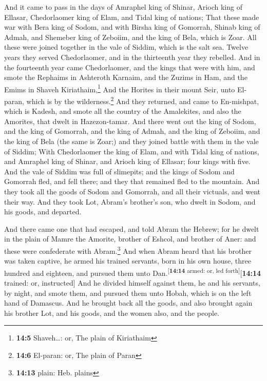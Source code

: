  And it came to pass in the days of Amraphel king of
Shinar, Arioch king of Ellasar, Chedorlaomer king of Elam, and Tidal
king of nations;  That these made war with Bera king of
Sodom, and with Birsha king of Gomorrah, Shinab king of Admah, and
Shemeber king of Zeboiim, and the king of Bela, which is Zoar.
 All these were joined together in the vale of Siddim,
which is the salt sea.  Twelve years they served
Chedorlaomer, and in the thirteenth year they rebelled. 
And in the fourteenth year came Chedorlaomer, and the kings that were
with him, and smote the Rephaims in Ashteroth Karnaim, and the Zuzims in
Ham, and the Emims in Shaveh Kiriathaim,\footnote{\textbf{14:5}
  Shaveh\ldots: or, The plain of Kiriathaim}  And the
Horites in their mount Seir, unto El-paran, which is by the
wilderness.\footnote{\textbf{14:6} El-paran: or, The plain of Paran}
 And they returned, and came to En-mishpat, which is
Kadesh, and smote all the country of the Amalekites, and also the
Amorites, that dwelt in Hazezon-tamar.  And there went out
the king of Sodom, and the king of Gomorrah, and the king of Admah, and
the king of Zeboiim, and the king of Bela (the same is Zoar;) and they
joined battle with them in the vale of Siddim;  With
Chedorlaomer the king of Elam, and with Tidal king of nations, and
Amraphel king of Shinar, and Arioch king of Ellasar; four kings with
five.  And the vale of Siddim was full of slimepits; and
the kings of Sodom and Gomorrah fled, and fell there; and they that
remained fled to the mountain.  And they took all the
goods of Sodom and Gomorrah, and all their victuals, and went their way.
 And they took Lot, Abram's brother's son, who dwelt in
Sodom, and his goods, and departed.

 And there came one that had escaped, and told Abram the
Hebrew; for he dwelt in the plain of Mamre the Amorite, brother of
Eshcol, and brother of Aner: and these were confederate with
Abram.\footnote{\textbf{14:13} plain: Heb. plains}  And
when Abram heard that his brother was taken captive, he armed his
trained servants, born in his own house, three hundred and eighteen, and
pursued them unto Dan.\textsuperscript{{[}\textbf{14:14} armed: or, led
forth{]}}{[}\textbf{14:14} trained: or, instructed{]} 
And he divided himself against them, he and his servants, by night, and
smote them, and pursued them unto Hobah, which is on the left hand of
Damascus.  And he brought back all the goods, and also
brought again his brother Lot, and his goods, and the women also, and
the people.

